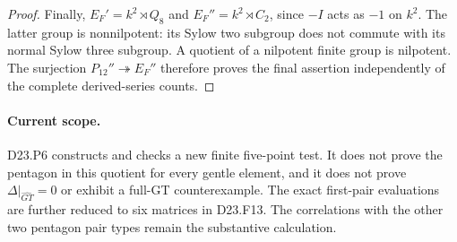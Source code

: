 \begin{proof}
Finally, $E_F'=k^2\rtimes Q_8$ and
$E_F''=k^2\rtimes C_2$, since $-I$ acts as $-1$ on $k^2$.
The latter group is nonnilpotent: its Sylow two subgroup does not
commute with its normal Sylow three subgroup. A quotient of a
nilpotent finite group is nilpotent. The surjection
$P_{12}''\twoheadrightarrow E_F''$ therefore proves the final
assertion independently of the complete derived-series counts.
\end{proof}

\paragraph{Current scope.}
D23.P6 constructs and checks a new finite five-point test. It does
not prove the pentagon in this quotient for every gentle element,
and it does not prove $\Delta|_{\widehat{GT}}=0$ or exhibit a
full-GT counterexample. The exact first-pair evaluations are further
reduced to six matrices in D23.F13. The correlations with the other
two pentagon pair types remain the substantive calculation.
